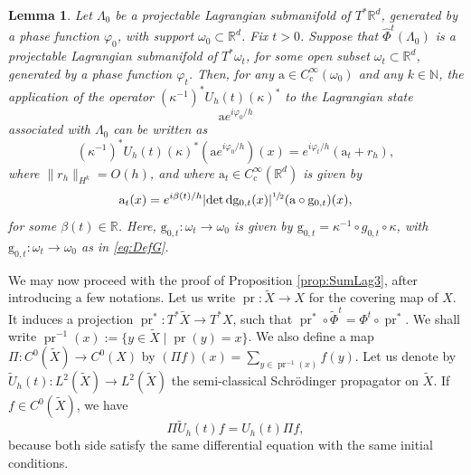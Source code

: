 \documentclass[10pt]{amsart}
\let\sep\mid
\newcommand{\rc}{\mathrm{c}}
\newcommand{\rd}{\,\mathrm{d}}
\theoremstyle{plain}
\newtheorem{lemma}[theorem]{Lemma}
\theoremstyle{definition}
\newcommand{\N}{\mathbb{N}}
\newcommand{\R}{\mathbb{R}}
\DeclareMathOperator{\pr}{pr}
\begin{document}
\begin{lemma}\label{lem:SchrodEucl}
Let $\Lambda_0$ be a projectable Lagrangian submanifold of $T^*\R^d$, generated by a phase function $\varphi_0$, with support $\omega_0\subset \R^d$. Fix $t>0$. Suppose that $\widehat{\Phi}^t(\Lambda_0)$ is a projectable Lagrangian submanifold of $T^*\omega_t$, for some open subset $\omega_t\subset\R^d$, generated by a phase function $\varphi_t$. Then, for any $\mathrm{a}\in C_\rc^\infty(\omega_0)$ and any $k\in \N$, the application of the operator $(\kappa^{-1})^* U_h(t)(\kappa)^*$ to the Lagrangian state
\begin{equation*}
\mathrm{a} e^{i\varphi_0/h}
\end{equation*}
associated with $\Lambda_0$ can be written as
\begin{equation*}
(\kappa^{-1})^* U_h(t)(\kappa)^*(\mathrm{a} e^{i\varphi_0/h})(x) = e^{i\varphi_t/h}(\mathrm{a}_t+ r_h),
\end{equation*}
where $\|r_h\|_{H^k}= O(h)$, and where $\mathrm{a}_t\in C_\rc^\infty(\R^d)$ is given by
\begin{equation}\label{eq:FormulaAmplitude}
\mathrm{a}_t(x)= e^{i\beta(t)/h} |{\det} \rd \mathrm{g}_{0,t}(x)|^{\sfrac{1}{2}} (\mathrm{a}\circ \mathrm{g}_{0,t})(x),
\end{equation}
for some $\beta(t)\in \R$. Here, $\mathrm{g}_{0,t} : \omega_t\to \omega_0$ is given by
$\mathrm{g}_{0,t} = \kappa^{-1} \circ g_{0,t} \circ \kappa$, with $\mathrm{g}_{0,t} :\omega_t\to \omega_0$
as in \eqref{eq:DefG}.
\end{lemma}

We may now proceed with the proof of Proposition \ref{prop:SumLag3}, after introducing a few notations. Let us write $\pr \!:\! \widetilde{X}\!\to\! X$ for the covering map of $X$. It induces a projection $\pr^* \!:\! T^*\widetilde{X}\!\to\! T^*X$, such that $\pr^*\circ \tilde{\Phi}^t\! =\! \Phi^t \circ \pr^*$. We shall write \hbox{$\pr^{-1}(x) \!:=\! \{y\!\in\! \widetilde{X}\sep \pr (y) \!=\! x\}$}. We also define a map $\Pi: C^0(\tilde{X}) \to C^0(X)$ by $(\Pi f)(x) = \sum_{y\in \pr^{-1}(x)} f(y)$.
Let us denote by $\tilde{U}_h(t) : L^2(\tilde{X})\to L^2(\tilde{X})$ the semi-classical Schrödinger propagator on $\tilde{X}$. If $f\in C^0(\tilde{X})$, we have
\begin{equation}\label{eq:PropagRevet}
\Pi \tilde{U}_h(t) f = U_h(t) \Pi f,
\end{equation}
because both side satisfy the same differential equation with the same initial conditions.
\end{document}
